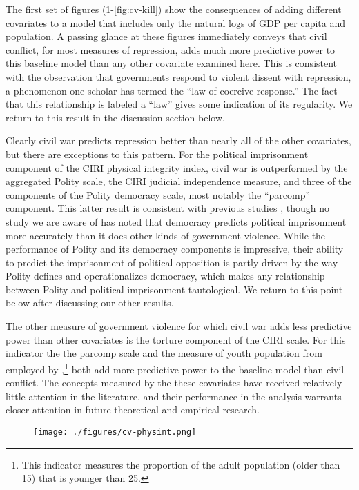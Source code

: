 \documentclass[12pt]{article}
\begin{document}
The first set of figures (\ref{fig:cv-physint}-\ref{fig:cv-kill}) show the consequences of adding different covariates to a model that includes only the natural logs of GDP per capita and population. A passing glance at these figures immediately conveys that civil conflict, for most measures of repression, adds much more predictive power to this baseline model than any other covariate examined here. This is consistent with the observation that governments respond to violent dissent with repression, a phenomenon one scholar \citep{Davenport2007AR} has termed the ``law of coercive response.'' The fact that this relationship is labeled a ``law'' gives some indication of its regularity. We return to this result in the discussion section below. 

Clearly civil war predicts repression better than nearly all of the other covariates, but there are exceptions to this pattern. For the political imprisonment component of the CIRI physical integrity index, civil war is outperformed by the aggregated Polity scale, the CIRI judicial independence measure, and three of the components of the Polity democracy scale, most notably the ``parcomp'' component. This latter result is consistent with previous studies \citep{Keith2002PRQ,BDMetal2005}, though no study we are aware of has noted that democracy predicts political imprisonment more accurately than it does other kinds of government violence. While the performance of Polity and its democracy components is impressive, their ability to predict the imprisonment of political opposition is partly driven by the way Polity defines and operationalizes democracy, which makes any relationship between Polity and political imprisonment tautological. We return to this point below after discussing our other results.

The other measure of government violence for which civil war adds less predictive power than other covariates is the torture component of the CIRI scale. For this indicator the the parcomp scale and the measure of youth population from \citet{Urdal2006} employed by \citet{NordaasDavenport2013},\footnote{This indicator measures the proportion of the adult population (older than 15) that is younger than 25.} both add more predictive power to the baseline model than civil conflict. The concepts measured by the these covariates have received relatively little attention in the literature, and their performance in the analysis warrants closer attention in future theoretical and empirical research. 
 
\begin{figure}[!htpb]
\centering
\texttt{[image: ./figures/cv-physint.png]}
\caption{}
\label{fig:cv-physint}
\end{figure}
\end{document}

